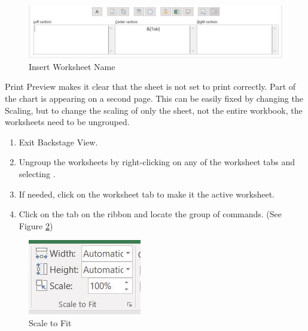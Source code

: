 \begin{figure}[H]
	\centering
	\includegraphics[width=\maxwidth{.95\linewidth}]{gfx/ch06_fig15}
	\caption{Insert Worksheet Name}
	\label{06:fig15}
\end{figure}

Print Preview makes it clear that the  sheet is not set to print correctly. Part of the chart is appearing on a second page. This can be easily fixed by changing the Scaling, but to change the scaling of only the  sheet, not the entire workbook, the worksheets need to be ungrouped.

\begin{enumerate}
	\item Exit Backstage View.
	\item Ungroup the worksheets by right-clicking on any of the worksheet tabs and selecting .
	\item If needed, click on the  worksheet tab to make it the active worksheet.
	\item Click on the  tab on the ribbon and locate the  group of commands. (See Figure  \ref{06:fig16})
\end{enumerate}

\begin{figure}[H]
	\centering
	\includegraphics[width=\maxwidth{.95\linewidth}]{gfx/ch06_fig16}
	\caption{Scale to Fit}
	\label{06:fig16}
\end{figure}

